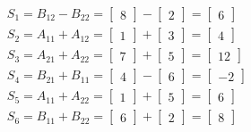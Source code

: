 \documentclass[a4paper,11pt]{article}
\begin{document}
\[
	\begin{align}

		S_1 = B_{12}-B_{22}=
		\begin{bmatrix}
			8
		\end{bmatrix}
		-
		\begin{bmatrix}
			2
		\end{bmatrix}
		=
		\begin{bmatrix}
			6
		\end{bmatrix} \\

		S_2 = A_{11}+A_{12}=
  	\begin{bmatrix}
 		1
  	\end{bmatrix}
		+
		\begin{bmatrix}
		3
		\end{bmatrix}
		=
		\begin{bmatrix}
		4
		\end{bmatrix} \\

		S_3 = A_{21}+A_{22}=
  	\begin{bmatrix}
 		7
  	\end{bmatrix}
		+
		\begin{bmatrix}
		5
		\end{bmatrix}
		=
		\begin{bmatrix}
		12
		\end{bmatrix} \\

		S_4 = B_{21}+B_{11}=
  	\begin{bmatrix}
 		4
  	\end{bmatrix}
		-
		\begin{bmatrix}
		6
		\end{bmatrix}
		=
		\begin{bmatrix}
		-2
		\end{bmatrix} \\

		S_5 = A_{11}+A_{22}=
  	\begin{bmatrix}
 		1
  	\end{bmatrix}
		+
		\begin{bmatrix}
		5
		\end{bmatrix}
		=
		\begin{bmatrix}
		6
		\end{bmatrix} \\

		S_6 = B_{11}+B_{22}=
  	\begin{bmatrix}
 		6
  	\end{bmatrix}
		+
		\begin{bmatrix}
		2
		\end{bmatrix}
		=
		\begin{bmatrix}
		8
		\end{bmatrix} \\


\end{align}\]
\end{document}
